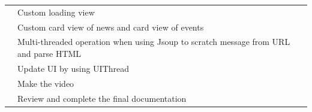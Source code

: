 \documentclass{article}
\begin{document}
\begin{table}[h]
\begin{tabular}{|c|l|}
            & Custom loading view \\
            \cline{2-2}
            & Custom card view of news and card view of events \\
            \cline{2-2}
            & Multi-threaded operation when using Jsoup 
            to scratch message from URL and parse HTML \\
            \cline{2-2}
            & Update UI by using UIThread \\
            \cline{2-2}
            & Make the video \\
            \cline{2-2}
            & Review and complete the final documentation \\
            \hline
        \end{tabular}
    \end{table}

    
\end{document}
